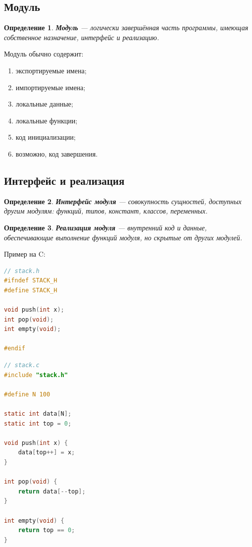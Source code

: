 \documentclass[12pt,a4paper]{article}
\newtheorem{definition}{Определение}
\begin{document}
\subsection{Модуль}

\begin{definition}
\textbf{Модуль} --- логически завершённая часть программы, имеющая собственное назначение, интерфейс и реализацию.
\end{definition}

Модуль обычно содержит:
\begin{enumerate}
  \item экспортируемые имена;
  \item импортируемые имена;
  \item локальные данные;
  \item локальные функции;
  \item код инициализации;
  \item возможно, код завершения.
\end{enumerate}

\subsection{Интерфейс и реализация}

\begin{definition}
\textbf{Интерфейс модуля} --- совокупность сущностей, доступных другим модулям: функций, типов, констант, классов, переменных.
\end{definition}

\begin{definition}
\textbf{Реализация модуля} --- внутренний код и данные, обеспечивающие выполнение функций модуля, но скрытые от других модулей.
\end{definition}

Пример на C:

\begin{lstlisting}[language=C]
// stack.h
#ifndef STACK_H
#define STACK_H

void push(int x);
int pop(void);
int empty(void);

#endif
\end{lstlisting}

\begin{lstlisting}[language=C]
// stack.c
#include "stack.h"

#define N 100

static int data[N];
static int top = 0;

void push(int x) {
    data[top++] = x;
}

int pop(void) {
    return data[--top];
}

int empty(void) {
    return top == 0;
}
\end{lstlisting}
\end{document}
